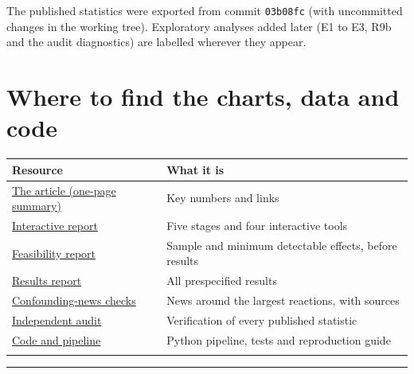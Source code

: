 \documentclass[12pt,a4paper]{article}
\begin{document}
The published statistics were exported from commit \texttt{03b08fc} (with uncommitted changes in the working tree). Exploratory analyses added later (E1 to E3, R9b and the audit diagnostics) are labelled wherever they appear.

\section*{Where to find the charts, data and code}
{\small\setlength{\tabcolsep}{4pt}\begin{tabularx}{\textwidth}{XX}
\toprule
\textbf{Resource} & \textbf{What it is} \\
\midrule
\href{https://nahianibnat-2000.github.io/space-shock/index.html}{The article (one-page summary)} & Key numbers and links \\
\href{https://nahianibnat-2000.github.io/space-shock/site/index.html}{Interactive report} & Five stages and four interactive tools \\
\href{https://github.com/NahianIbnat-2000/space-shock/blob/master/reports/04_feasibility_report.md}{Feasibility report} & Sample and minimum detectable effects, before results \\
\href{https://github.com/NahianIbnat-2000/space-shock/blob/master/reports/05_results.md}{Results report} & All prespecified results \\
\href{https://github.com/NahianIbnat-2000/space-shock/blob/master/docs/CONFOUNDING_NEWS.md}{Confounding-news checks} & News around the largest reactions, with sources \\
\href{https://github.com/NahianIbnat-2000/space-shock/blob/master/audit/AUDIT_REPORT.md}{Independent audit} & Verification of every published statistic \\
\href{https://github.com/NahianIbnat-2000/space-shock}{Code and pipeline} & Python pipeline, tests and reproduction guide \\
 &  \\
\bottomrule
\end{tabularx}}
\vspace{6pt}

\vspace{1.5em}\noindent\rule{\textwidth}{0.4pt}\par{}
\end{document}
